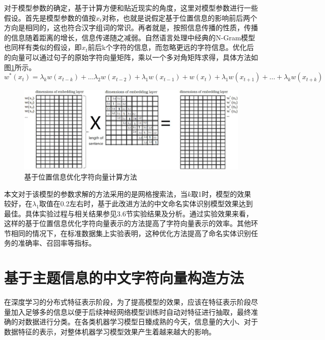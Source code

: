 \documentclass[winfonts,master,oneside,nobackinfo]{njuthesis}
\begin{document}
对于模型参数的确定，基于计算方便和贴近现实的角度，这里对模型参数进行一些假设。首先是模型参数的值按$x_{t}$对称，也就是说假定基于位置信息的影响前后两个方向是相同的，这也符合汉字组词的常识。再者就是，按照信息传播的性质，传播的信息随着距离的增长，信息传递随之减弱。自然语言处理中经典的N-Gram模型也同样有类似的假设，即$x_{t}$前后k个字符的信息，而忽略更远的字符信息。优化后的向量可以通过句子的原始字符向量矩阵，乘以一个多对角矩阵求得，具体方法如图\ref{modify-site}所示。
\begin{equation}
w^{*}\left(x_{t}\right)=\lambda_{k} w\left(x_{t-k}\right)+\ldots \lambda_{2}w\left(x_{t-2}\right)+\lambda_{1} w\left(x_{t-1}\right)+ w\left(x_{t}\right)+\lambda_{1} w\left(x_{t+1}\right)+\ldots+\lambda_{k} w\left(x_{t+k}\right)
\end{equation}
\begin{figure}[h]
\centering
\includegraphics[width=1.04\textwidth]{./figure/基于位置信息变化.jpg}
\caption{基于位置信息优化字符向量计算方法}
\label{modify-site}
\end{figure}

本文对于该模型的参数求解的方法采用的是网格搜索法，当$k$取1时，模型的效果较好，在$\lambda_{1}$取值在0.2左右时，基于此改进方法的中文命名实体识别模型效果达到最佳。具体实验过程与相关结果参见3.6节实验结果及分析。通过实验效果来看，这样的基于位置信息优化字符向量表示的方法提高了字符向量表示的效率。其他环节相同的情况下，在标准数据集上实验表明，这种优化方法提高了命名实体识别任务的准确率、召回率等指标。

\section{基于主题信息的中文字符向量构造方法}

在深度学习的分布式特征表示阶段，为了提高模型的效果，应该在特征表示阶段尽量加入足够多的信息以便于后续神经网络模型训练时自动对特征进行抽取，最终准确的对数据进行分类。在各类机器学习模型日臻成熟的今天，信息量的大小、对于数据特征的表示，对整体机器学习模型效果产生着越来越大的影响。
\end{document}
